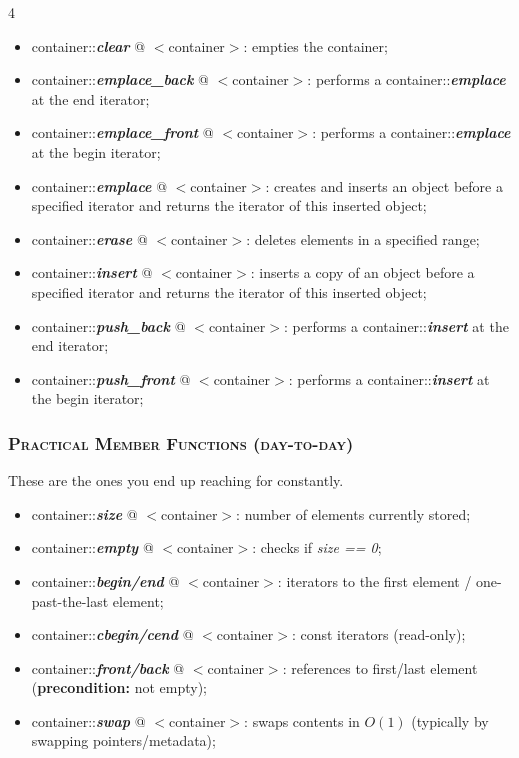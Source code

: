 \documentclass[10pt]{article}
\begin{document}
\begin{multicols*}{4}
{\begin{itemize}[leftmargin=*,topsep=0.25pt]
  \setlength\itemsep{-1.8pt}
	\item container::\emph{\textbf{clear}} @ $<$container$>$: empties the container;
	\item container::\emph{\textbf{emplace\_back}} @ $<$container$>$: performs a container::\emph{\textbf{emplace}} at the end iterator;
	\item container::\emph{\textbf{emplace\_front}} @ $<$container$>$: performs a container::\emph{\textbf{emplace}} at the begin iterator;
	\item container::\emph{\textbf{emplace}} @ $<$container$>$: creates and inserts an object before a specified iterator and returns the iterator of this inserted object;
	\item container::\emph{\textbf{erase}} @ $<$container$>$: deletes elements in a specified range;
	\item container::\emph{\textbf{insert}} @ $<$container$>$: inserts a copy of an object before a specified iterator and returns the iterator of this inserted object;
	\item container::\emph{\textbf{push\_back}} @ $<$container$>$: performs a container::\emph{\textbf{insert}} at the end iterator;
	\item container::\emph{\textbf{push\_front}} @ $<$container$>$: performs a container::\emph{\textbf{insert}} at the begin iterator;
\end{itemize}
\noindent


\subsubsection*{\textsc{Practical Member Functions (day-to-day)}} 
\noindent These are the ones you end up reaching for constantly.

\begin{itemize}[leftmargin=*,topsep=0.25pt]
  \setlength\itemsep{-1.8pt}
  \item container::\emph{\textbf{size}} @ $<$container$>$: number of elements currently stored;
  \item container::\emph{\textbf{empty}} @ $<$container$>$: checks if \emph{size == 0};
  \item container::\emph{\textbf{begin/end}} @ $<$container$>$: iterators to the first element / one-past-the-last element;
  \item container::\emph{\textbf{cbegin/cend}} @ $<$container$>$: const iterators (read-only);
  \item container::\emph{\textbf{front/back}} @ $<$container$>$: references to first/last element (\textbf{precondition:} not empty);
  \item container::\emph{\textbf{swap}} @ $<$container$>$: swaps contents in $O(1)$ (typically by swapping pointers/metadata);
\end{itemize}

}
\end{multicols*}
\end{document}
